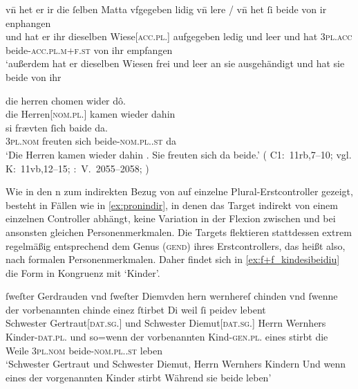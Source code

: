 \begin{exe}
\ex \label{ex:pronindir}
	\begin{xlist}
	\ex \label{ex:pronindir_1}
		\gll vn̄ het er ir {die ſelben} Matta vfgegeben lidig vn̄ lere /
			vn̄ het ſi beide von ir enphangen \\
			und hat er ihr dieselben Wiese[\textsc{acc.pl.\FemI}] aufgegeben
			ledig und leer {} und hat \textsc{3pl\subI.acc}
			beide-\textsc{acc.pl.m+f\subI.st} von ihr empfangen \\
		\trans `außerdem hat er dieselben Wiesen frei und leer an sie
			ausgehändigt und hat sie beide von ihr 
			\parencites(Nr.~2733, Freiburg i.\,Br., 1297)[105,23--24]{cao4}

	\ex \label{ex:pronindir_2}
		\gll die herren chomen wider dô. \\
			die Herren[\textsc{nom.pl.\MascM}] kamen wieder dahin \\
			\textelp{}
	\sn \gll si frævten ſich baide da. \\
			\textsc{3pl\subM.nom} freuten sich beide-\textsc{nom.pl.\MascM.st}
			da \\
		\trans `Die Herren kamen wieder dahin \textelp{}. Sie freuten sich da
			beide.'
			(%
				C1:~11rb,7--10; vgl.
				K:~11vb,12--15;
				\KC:~V.~2055--2058;
				\cite[119]{schroeder1895}%
			)
	\end{xlist}
\end{exe}

Wie in den n
 zum indirekten
Bezug von  auf einzelne Plural-Erstcontroller gezeigt, besteht in
Fällen wie in \cref{ex:pronindir}, in denen das Target indirekt von einem
einzelnen Controller abhängt, keine Variation in der Flexion zwischen
 und  bei ansonsten gleichen Personenmerkmalen. Die
Targets flektieren stattdessen extrem regelmäßig entsprechend dem Genus (\textsc{gend})
ihres Erstcontrollers, das heißt also, nach formalen Personenmerkmalen. Daher
findet sich in \cref{ex:f+f_kindesibeidiu} die Form  in Kongruenz
mit  `Kinder'.

\begin{exe}
\ex \label{ex:f+f_kindesibeidiu}
	\gll ſweſter Gerdrauden vnd ſweſter Diemvden hern wernhereſ
			chinden \textelp{} vnd ſwenne der vorbenannten
			chinde einez ſtirbet \textelp{} Di weil ſi
			peidev lebent \\
		Schwester Gertraut[\textsc{dat.sg.\FemF}] und Schwester Diemut[\textsc{dat.sg.\FemF}]
			Herrn Wernhers Kinder-\textsc{dat.pl.\NeutF} {} und so=wenn der
			vorbenannten Kind-\textsc{gen.pl.\NeutF} eines stirbt {} die Weile
			\textsc{3pl\subF.nom} beide-\textsc{nom.pl.\NeutF.st} leben \\
	\trans `Schwester Gertraut und Schwester Diemut, Herrn Wernhers
		Kindern \textelp{} Und wenn eines der vorgenannten Kinder stirbt
		\textelp{} Während sie beide leben'
		\parencites(Nr.~2960, Engelthal, Kr.~Nürnberger Land, 1298)[240,31--38]{cao4}
\end{exe}

